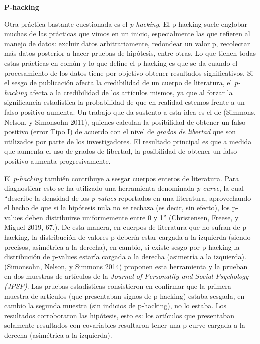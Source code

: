 \documentclass[
  spanish,
  letterpaper,
  DIV=11,
  numbers=noendperiod]{scrreprt}
\begin{document}
\textbf{P-hacking}

Otra práctica bastante cuestionada es el \emph{p-hacking}. El p-hacking
suele englobar muchas de las prácticas que vimos en un inicio,
especialmente las que refieren al manejo de datos: excluir datos
arbitrariamente, redondear un valor p, recolectar más datos posterior a
hacer pruebas de hipótesis, entre otras. Lo que tienen todas estas
prácticas en común y lo que define el p-hacking es que se da cuando el
procesamiento de los datos tiene por objetivo obtener resultados
significativos. Si el sesgo de publicación afecta la credibilidad de un
cuerpo de literatura, el \emph{p-hacking} afecta a la credibilidad de
los artículos mismos, ya que al forzar la significancia estadística la
probabilidad de que en realidad estemos frente a un falso positivo
aumenta. Un trabajo que da sustento a esta idea es el de (Simmons,
Nelson, y Simonsohn 2011), quienes calculan la posibilidad de obtener un
falso positivo (error Tipo I) de acuerdo con el nivel de \emph{grados de
libertad} que son utilizados por parte de los investigadores. El
resultado principal es que a medida que aumenta el uso de grados de
libertad, la posibilidad de obtener un falso positivo aumenta
progresivamente.

El \emph{p-hacking} también contribuye a sesgar cuerpos enteros de
literatura. Para diagnosticar esto se ha utilizado una herramienta
denominada \emph{p-curve}, la cual ``describe la densidad de los
\emph{p-values} reportados en una literatura, aprovechando el hecho de
que si la hipótesis nula no se rechaza (es decir, sin efecto), los
p-values deben distribuirse uniformemente entre 0 y 1'' (Christensen,
Freese, y Miguel 2019, 67.). De esta manera, en cuerpos de literatura
que no sufran de p-hacking, la distribución de valores p debería estar
cargada a la izquierda (siendo precisos, asimétrica a la derecha), en
cambio, si existe sesgo por p-hacking la distribución de p-values
estaría cargada a la derecha (asimetría a la izquierda). (Simonsohn,
Nelson, y Simmons 2014) proponen esta herramienta y la prueban en dos
muestras de artículos de la \emph{Journal of Personality and Social
Psychology (JPSP)}. Las pruebas estadísticas consistieron en confirmar
que la primera muestra de artículos (que presentaban signos de
p-hacking) estaba sesgada, en cambio la segunda muestra (sin indicios de
p-hacking), no lo estaba. Los resultados corroboraron las hipótesis,
esto es: los artículos que presentaban solamente resultados con
covariables resultaron tener una p-curve cargada a la derecha
(asimétrica a la izquierda).
\end{document}
